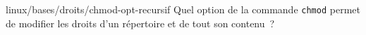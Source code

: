 \begin{question}{linux/bases/droits/chmod-opt-recursif}
  Quel option de la commande {\tt chmod} permet de modifier les droits
  d'un répertoire et de tout son contenu~?
  \begin{reponses}
    \lastchoices
  \end{reponses}
\end{question}
